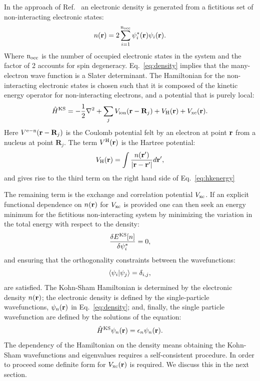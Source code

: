 In the approach of Ref.~\cite{kohnsham65} an electronic density is 
generated from a fictitious set of non-interacting electronic states:
%
\begin{equation}
\label{eq:density}
n({\bf r}) = 2\sum^{\rm{n_{occ}}}_{i=1} \psi_{i}^{*}({\bf r})\psi_{i}({\bf r}).
\end{equation}
%
Where $\rm{n_{occ}}$ is the number of occupied electronic states in the system and the
factor of 2 accounts for spin degeneracy. Eq.~\ref{eq:density} implies that the many-electron
wave function is a Slater determinant. The Hamiltonian for the non-interacting electronic
states is chosen such that it is composed of the kinetic energy operator for non-interacting
electrons, and a potential that is purely local:
%
\begin{equation}
\label{eq:lda}
\hat{H}^{\rm{KS}} = -\frac{1}{2}\nabla^{2} + \sum_{j}V_{\rm ion}({\bf r}-\mathbf{R}_{j}) + V_{\rm H}({\bf r}) + V_{\rm xc}({\bf r}).
\end{equation}
%
Here $V^{\rm{e-n}}({\bf r}-\mathbf{R}_{j})$ is the Coulomb potential felt by an
electron at point ${\bf r}$ from a nucleus at point $\mathbf{R}_{j}$.
The term $V^{\rm{H}}({\bf r})$ is the Hartree potential:
%
\begin{equation}
V_{\rm{H}}({\bf r}) = \int \frac{n({\bf r}')}{|{\bf r}-{\bf r}'|}d{\bf r}',
\end{equation}
%
and gives rise to the third term on the right hand side of Eq.~\ref{eq:hkenergy}

The remaining term is the exchange and correlation potential $V_{\rm{xc}}$. 
If an explicit functional dependence on $n({\bf r})$ for $V_{\rm{xc}}$ is provided 
one can then seek an energy minimum for the fictitious non-interacting system 
by minimizing the variation in the total energy with respect to the density:
%
\begin{equation}
\frac{\delta E^{\rm{KS}}[n]}{\delta \psi^{*}_{i}} = 0,
\end{equation}
%
and ensuring that the orthogonality constraints between the wavefunctions:
%
\begin{equation}
\langle \psi_{i} |\psi_{j}\rangle = \delta_{i,j},
\end{equation}
%
are satisfied.
%
The Kohn-Sham Hamiltonian is determined by the electronic density $n({\bf r})$; the electronic density is 
defined by the single-particle wavefunctions, $\psi_{n}({\bf r})$ in Eq.~\ref{eq:density}; and, 
finally, the single particle wavefunction are defined by the solutions of the equation:
%
\begin{equation}
\label{eq:kseq}
\hat{H}^{\rm{KS}}\psi_{n}({\bf r}) = \epsilon_{n}\psi_{n}({\bf r}).
\end{equation}
%
The dependency of the Hamiltonian on the density means obtaining the Kohn-Sham 
wavefunctions and eigenvalues requires a self-consistent
procedure. In order to proceed some definite form for $V_{\rm{xc}}({\bf r})$ 
is required. We discuss this in the next section.

